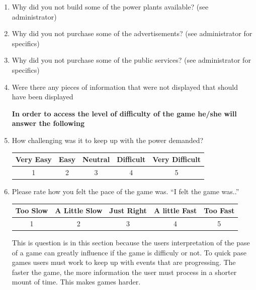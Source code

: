 \documentclass[msc,oneside]{ubcthesis}%
\begin{document}
    \begin{enumerate}
      \item Why did you not build some of the power plants available? (see administrator)
      \item Why did you not purchase some of the advertisements? (see administrator for specifics)
      \item Why did you not purchase some of the public services? (see administrator for specifics)
      \item Were there any pieces of information that were not displayed that should have been displayed
    

    \newpage
    \textbf{In order to access the level of difficulty of the game he/she will answer 
    the following}

      \item How challenging was it to keep up with the power demanded?
      \begin{table}[tbph]
        \centering        
        \label{table:challenging}
        \begin{tabular}{|c|c|c|c|c|}
          \hline
          Very Easy & Easy & Neutral & Difficult & Very Difficult \\ \hline
          1 & 2 & 3 & 4 & 5 \\ \hline
        \end{tabular}
      \end{table}

      \item Please rate how you felt the pace of the game was.
      ``I felt the game was..''

      \begin{table}[tbph]
        \centering        
        \label{table:pase}
        \begin{tabular}{|c|c|c|c|c|}
          \hline
          Too Slow & A Little Slow & Just Right & A little Fast & Too Fast \\ \hline
          1 & 2 & 3 & 4 & 5 \\ \hline
        \end{tabular}
      \end{table}

      This is question is in this section because the users interpretation of the pase of a game can greatly influence if the game is difficuly or not. To quick pase games users must work to keep up with events that are progressing. The faster the game, the more information the user must process in a shorter mount of time. This makes games harder.  


\end{enumerate}
\end{document}
